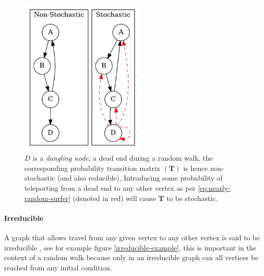 \documentclass[11pt]{article}
\begin{document}
\begin{figure}[htbp]
\centering
\includegraphics[width=6cm]{media/dot/stochastic_graph_example.dot.png}
\caption{\label{fig:stochastic-example}\(D\) is a \emph{dangling node}, a dead end during a random walk, the corresponding probability transition matrix \((\mathbf{T})\) is hence non-stochastic (and also reducible), Introducing some probability of teleporting from a dead end to any other vertex as per \eqref{eq:nearly-random-surfer} (denoted in red) will cause \(\mathbf{T}\) to be stochastic.}
\end{figure}

\paragraph{Irreducible}
\label{sec:orgcd7937a}
A graph that allows travel from any given vertex to any other vertex is said to be irreducible \cite{langvilleGooglePageRankScience2012}, see for example figure \ref{irreducible-example}, this is important in the context of a random walk because only in an irreducible graph can all vertices be reached from any initial condition.
\end{document}
